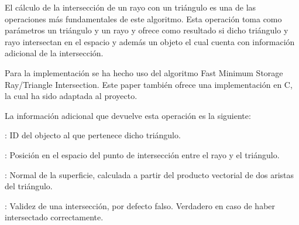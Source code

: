 El cálculo de la intersección de un rayo con un triángulo es una de las operaciones más fundamentales de este algoritmo. Esta operación toma como parámetros un triángulo  y un rayo  y ofrece como resultado si dicho triángulo y rayo intersectan en el espacio y además un objeto  el cual cuenta con información adicional de la intersección.


Para la implementación se ha hecho uso del algoritmo Fast Minimum Storage Ray/Triangle Intersection\cite{triintersection}. Este paper también ofrece una implementación en C, la cual ha sido adaptada al proyecto.

La información adicional que devuelve esta operación es la siguiente:

	: ID del objecto al que pertenece dicho triángulo.
	
	: Posición en el espacio del punto de intersección entre el rayo y el triángulo.
	
	: Normal de la superficie, calculada a partir del producto vectorial de dos aristas del triángulo.
	
	: Validez de una intersección, por defecto falso. Verdadero en caso de haber intersectado correctamente.







	










